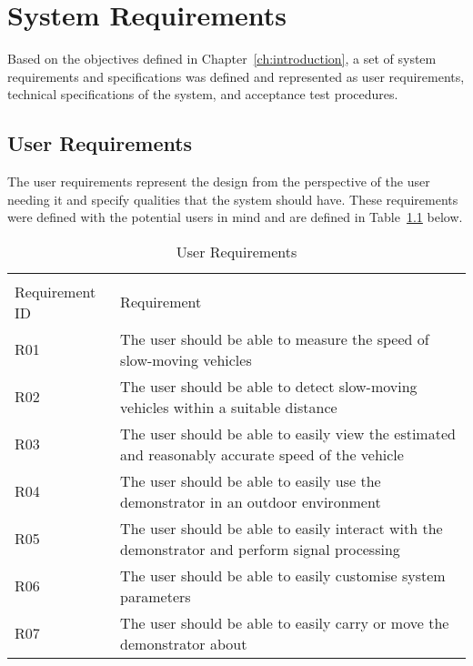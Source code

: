 \documentclass[class=report,11pt,crop=false]{standalone}
\begin{document}
\chapter{System Requirements \label{ch:requirements}}
\vspace{-1cm}
Based on the objectives defined in Chapter~\ref{ch:introduction}, a set of system requirements and specifications was defined and represented as user requirements, technical specifications of the system, and acceptance test procedures.

\section{User Requirements}
The user requirements represent the design from the perspective of the user needing it and specify qualities that the system should have. These requirements were defined with the potential users in mind and are defined in Table~\ref{tab:Table 1} below.
\begin{table}[!htp]
\centering
\caption{\label{tab:Table 1} User Requirements}
\vspace{-0.5cm}
\begin{tabular}{|m{7em}|m{12cm}|}
\multicolumn{2}{l}{}\\
\cline{1-2}
Requirement ID  & Requirement\\ \cline{1-2}
R01   & The user should be able to measure the speed of slow-moving vehicles \\ \cline{1-2}
R02   & The user should be able to detect slow-moving vehicles within a suitable distance \\ \cline{1-2}
R03   & The user should be able to easily view the estimated and reasonably accurate speed of the vehicle \\ \cline{1-2}
R04   & The user should be able to easily use the demonstrator in an outdoor environment \\ \cline{1-2}
R05   &  The user should be able to easily interact with the demonstrator and perform signal processing\\ \cline{1-2}
R06   & The user should be able to easily customise system parameters \\ \cline{1-2}
R07   & The user should be able to easily carry or move the demonstrator about \\ \cline{1-2}
\end{tabular}
\end{table}
\end{document}
